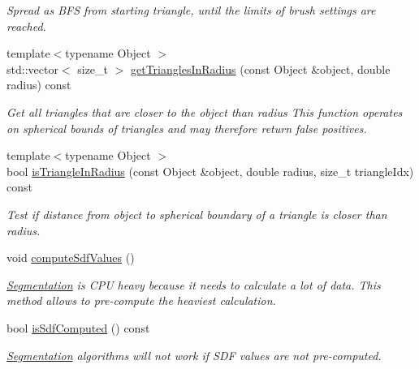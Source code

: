 \begin{DoxyCompactItemize}
\begin{DoxyCompactList}\small\item\em Spread as B\+FS from starting triangle, until the limits of brush settings are reached. \end{DoxyCompactList}\item 
{\footnotesize template$<$typename Object $>$ }\\std\+::vector$<$ size\+\_\+t $>$ \mbox{\hyperlink{classpepr3d_1_1_geometry_a4907bc6f193156a3d68956b2ce622120}{get\+Triangles\+In\+Radius}} (const Object \&object, double radius) const
\begin{DoxyCompactList}\small\item\em Get all triangles that are closer to the object than radius This function operates on spherical bounds of triangles and may therefore return false positives. \end{DoxyCompactList}\item 
{\footnotesize template$<$typename Object $>$ }\\bool \mbox{\hyperlink{classpepr3d_1_1_geometry_a993a7383980e9c4aa955ae156d714f15}{is\+Triangle\+In\+Radius}} (const Object \&object, double radius, size\+\_\+t triangle\+Idx) const
\begin{DoxyCompactList}\small\item\em Test if distance from object to spherical boundary of a triangle is closer than radius. \end{DoxyCompactList}\item 
\mbox{\label{classpepr3d_1_1_geometry_abba4d7a86b23f0d1a5aef9739d087f7d}} 
void \mbox{\hyperlink{classpepr3d_1_1_geometry_abba4d7a86b23f0d1a5aef9739d087f7d}{compute\+Sdf\+Values}} ()
\begin{DoxyCompactList}\small\item\em \mbox{\hyperlink{classpepr3d_1_1_segmentation}{Segmentation}} is C\+PU heavy because it needs to calculate a lot of data. This method allows to pre-\/compute the heaviest calculation. \end{DoxyCompactList}\item 
\mbox{\label{classpepr3d_1_1_geometry_a4acf91e1482adf0a1a77d03c23c108b3}} 
bool \mbox{\hyperlink{classpepr3d_1_1_geometry_a4acf91e1482adf0a1a77d03c23c108b3}{is\+Sdf\+Computed}} () const
\begin{DoxyCompactList}\small\item\em \mbox{\hyperlink{classpepr3d_1_1_segmentation}{Segmentation}} algorithms will not work if S\+DF values are not pre-\/computed. \end{DoxyCompactList}\item 

\end{DoxyCompactItemize}
